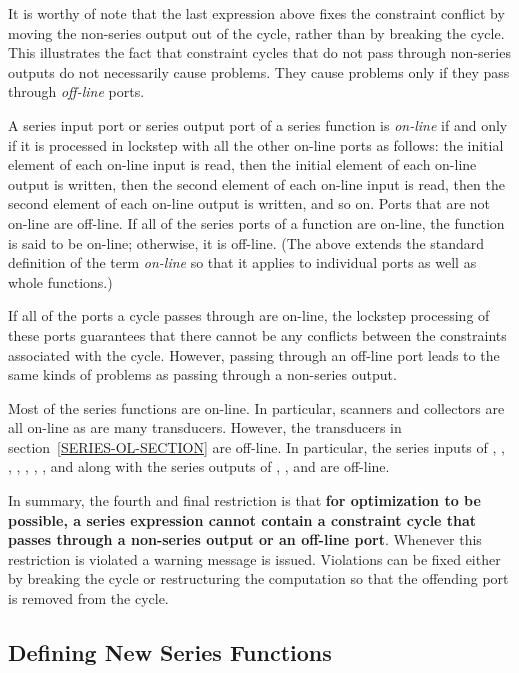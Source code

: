 It is worthy of note that the last expression above fixes the constraint
conflict by moving the non-series output out of the cycle, rather than by
breaking the cycle.  This illustrates the fact that constraint cycles that
do not pass through non-series outputs do not necessarily cause problems.
They cause problems only if they pass through \emph{off-line} ports.

A series input port or series output port of a series function is \emph{on-line}
if and only if it is processed in lockstep with all the other on-line
ports as follows:  the initial element of each on-line input is
read, then the initial element of each on-line output is written, then the
second element of each on-line input is read, then the second element of
each on-line output is written, and so on.  Ports that are not on-line are
off-line.  If all of the series ports of a function are on-line, the
function is said to be on-line; otherwise, it is off-line.  (The above
extends the standard definition of the term \emph{on-line} so that it applies
to individual ports as well as whole functions.)

If all of the ports a cycle passes through are on-line, the lockstep
processing of these ports guarantees that there cannot be any conflicts
between the constraints associated with the cycle.  However, passing
through an off-line port leads to the same kinds of problems as passing
through a non-series output.

Most of the series functions are on-line.  In particular, scanners and
collectors are all on-line as are many transducers.  However, the
transducers in section~\ref{SERIES-OL-SECTION} are off-line.  In particular, the
series inputs of , , , , ,
, , and  along with the
series outputs of , , and  are off-line.

In summary, the fourth and final restriction is that {\bf for optimization
to be possible, a series expression cannot contain a constraint cycle that
passes through a non-series output or an off-line port}.  Whenever this
restriction is violated a warning message is issued.  Violations can be
fixed either by breaking the cycle or restructuring the computation so that
the offending port is removed from the cycle.

\subsection{Defining New Series Functions}

